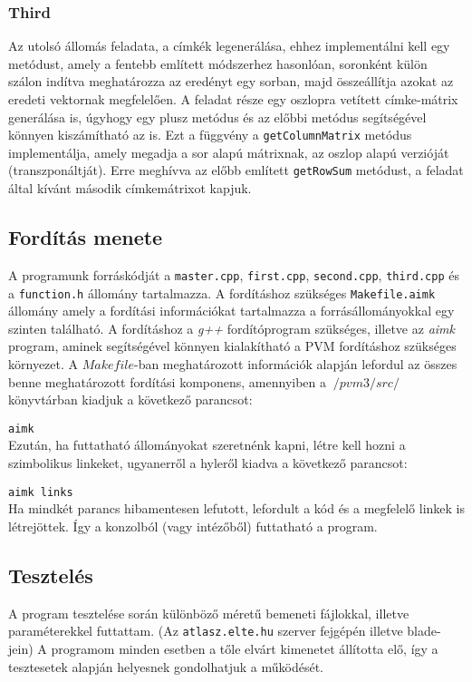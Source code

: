 \documentclass[12pt]{article}
\begin{document}
\subsubsection{Third}
Az utolsó állomás feladata, a címkék legenerálása, ehhez implementálni kell egy metódust, amely a fentebb említett módszerhez hasonlóan, soronként külön szálon indítva meghatározza az eredényt egy sorban, majd összeállítja azokat az eredeti vektornak megfelelően.
A feladat része egy oszlopra vetített címke-mátrix generálása is, úgyhogy egy plusz metódus és az előbbi metódus segítségével könnyen kiszámítható az is. Ezt a függvény a \verb|getColumnMatrix| metódus implementálja, amely megadja a sor alapú mátrixnak, az oszlop alapú verzióját (transzponáltját). Erre meghívva az előbb említett \verb|getRowSum| metódust, a feladat által kívánt második címkemátrixot kapjuk.

\subsection{Fordítás menete}

A programunk forráskódját a \verb|master.cpp|, \verb|first.cpp|, \verb|second.cpp|, \verb|third.cpp| és a \verb|function.h| állomány tartalmazza. A fordításhoz szükséges \verb|Makefile.aimk| állomány amely a fordítási információkat tartalmazza a forrásállományokkal egy szinten található.
A fordításhoz a \textit{g++} fordítóprogram szükséges, illetve az \textit{aimk} program, aminek segítségével könnyen kialakítható a PVM fordításhoz szükséges környezet. A $Makefile$-ban meghatározott információk alapján lefordul az összes benne meghatározott fordítási komponens, amennyiben a $~/pvm3/src/$ könyvtárban kiadjuk a következő parancsot:

\verb|aimk| \\
Ezután, ha futtatható állományokat szeretnénk kapni, létre kell hozni a szimbolikus linkeket, ugyanerről a hyleről kiadva a következő parancsot:

\verb|aimk links|\\
Ha mindkét parancs hibamentesen lefutott, lefordult a kód és a megfelelő linkek is létrejöttek. Így a konzolból (vagy intézőből) futtatható a program.

\subsection{Tesztelés}

A program tesztelése során különböző méretű bemeneti fájlokkal, illetve paraméterekkel futtattam. (Az \verb|atlasz.elte.hu| szerver fejgépén illetve blade-jein)
A programom minden esetben a tőle elvárt kimenetet állította elő, így a tesztesetek alapján helyesnek gondolhatjuk a működését.
\end{document}
